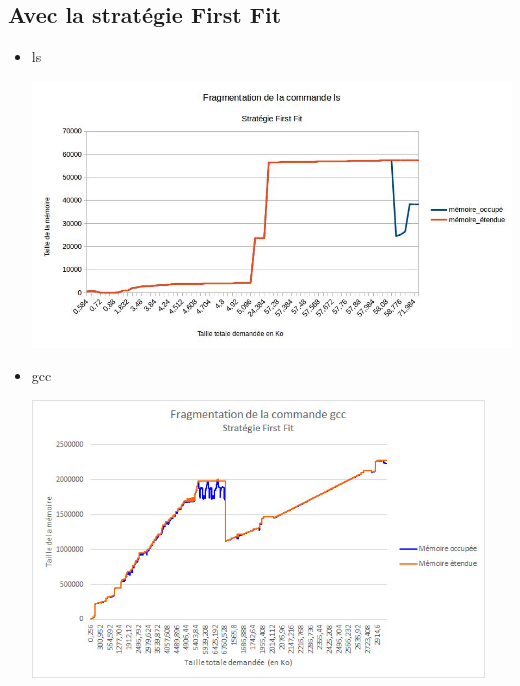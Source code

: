 \documentclass{article}
\begin{document}
\subsection{Avec la stratégie First Fit}
\begin{itemize}
	\item ls

\begin{center}	
\includegraphics[width=15cm]{ls_firstfit.jpg}
\end{center}
	\item gcc

\begin{center}	
\includegraphics[width=12cm]{gcc_firstfit.jpg}
\end{center}
\end{itemize}
\end{document}
